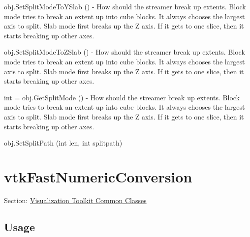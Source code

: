 \begin{DoxyItemize}
\item {\ttfamily obj.\-Set\-Split\-Mode\-To\-Y\-Slab ()} -\/ How should the streamer break up extents. Block mode tries to break an extent up into cube blocks. It always chooses the largest axis to split. Slab mode first breaks up the Z axis. If it gets to one slice, then it starts breaking up other axes.  
\item {\ttfamily obj.\-Set\-Split\-Mode\-To\-Z\-Slab ()} -\/ How should the streamer break up extents. Block mode tries to break an extent up into cube blocks. It always chooses the largest axis to split. Slab mode first breaks up the Z axis. If it gets to one slice, then it starts breaking up other axes.  
\item {\ttfamily int = obj.\-Get\-Split\-Mode ()} -\/ How should the streamer break up extents. Block mode tries to break an extent up into cube blocks. It always chooses the largest axis to split. Slab mode first breaks up the Z axis. If it gets to one slice, then it starts breaking up other axes.  
\item {\ttfamily obj.\-Set\-Split\-Path (int len, int splitpath)}  
\end{DoxyItemize}\hypertarget{vtkcommon_vtkfastnumericconversion}{}\section{vtk\-Fast\-Numeric\-Conversion}\label{vtkcommon_vtkfastnumericconversion}
Section\-: \hyperlink{sec_vtkcommon}{Visualization Toolkit Common Classes} \hypertarget{vtkwidgets_vtkxyplotwidget_Usage}{}\subsection{Usage}\label{vtkwidgets_vtkxyplotwidget_Usage}
